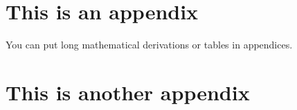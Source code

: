 \documentclass[12pt]{report}
\newcommand{\mnras}{MNRAS}
\newcommand{\aap}{A\&A}
\begin{document}
%




\begin{appendix}

\chapter{This is an appendix}
\label{ap:input_code}
You can put long mathematical derivations or tables in appendices.

\chapter{This is another appendix}

\end{appendix}
\end{document}
